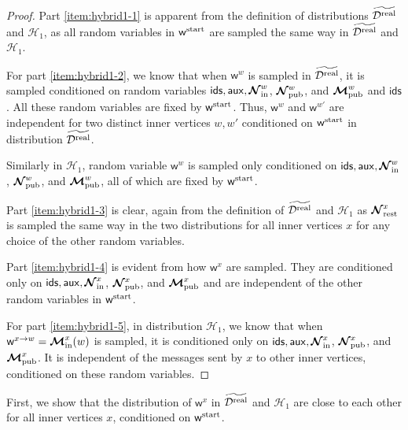 \documentclass[11pt]{article}
\theoremstyle{definition}
\newcommand{\rv}[1]{\ensuremath{{\mathsf{#1}}}\xspace}
\newcommand{\rNinner}[2]{\ensuremath{\bm{\mathcal{N}}_{\textnormal{in}}^{#1_{#2}}}}
\newcommand{\cH}{\ensuremath{\mathcal{H}}}
\newcommand{\cD}{\ensuremath{\mathcal{D}}}
\newcommand{\cDreal}{\ensuremath{\cD^{\textnormal{real}}}}
\newcommand{\cDrealtil}{\ensuremath{\widetilde{\cDreal}}}
\newcommand{\raux}{\ensuremath{\rv{aux}}}
\newcommand{\rNpub}[1]{\ensuremath{\bm{\mathcal{N}}_{\textnormal{pub}}^{#1}}}
\newcommand{\rMpub}[1]{\ensuremath{\bm{\mathcal{M}}_{\textnormal{pub}}^{#1}}}
\newcommand{\rMinner}[1]{\ensuremath{\bm{\mathcal{M}}_{\textnormal{in}}^{#1}}}
\newcommand{\rNrest}[1]{\ensuremath{\bm{\mathcal{N}}^{#1}_{\textnormal{rest}}}}
\newcommand{\rids}{\ensuremath{\rv{ids}}}
\newcommand{\rw}{\rv{w}}
\newcommand{\rwstart}{\rv{w}^{\textnormal{start}}}
\begin{document}
\begin{proof}
Part \ref{item:hybrid1-1} is apparent from the definition of distributions $\cDrealtil$ and $\cH_1$, as all random variables in $\rwstart$ are sampled the same way in $\cDrealtil$ and $\cH_1$.

For part \ref{item:hybrid1-2}, we know that when $\rw^{w}$ is sampled in $\cDrealtil$, it is sampled conditioned on random variables $\rids, \raux,  \rNinner{w}{}$, $\rNpub{w}$, and $\rMpub{w}$ and $\rids$. All these random variables are fixed by $\rwstart$. Thus, $\rw^{w}$ and $\rw^{w'}$ are independent for two distinct inner vertices $w, w'$ conditioned on $\rwstart$ in distribution $\cDrealtil$. 

Similarly in $\cH_1$, random variable $\rw^{w}$ is sampled only conditioned on $\rids, \raux,  \rNinner{w}{}$, $\rNpub{w}$, and $\rMpub{w}$, all of which are fixed by $\rwstart$.

Part \ref{item:hybrid1-3} is clear, again from the definition of $\cDrealtil$ and $\cH_1$ as $\rNrest{x}$ is sampled the same way in the two distributions for all inner vertices $x$ for any choice of the other random variables. 

Part \ref{item:hybrid1-4} is evident from how $\rw^{x}$ are sampled. They are conditioned only on $\rids, \raux,  \rNinner{x}{}$, $\rNpub{x}$, and $\rMpub{x}$ and are independent of the other random variables in $\rwstart$.

For part \ref{item:hybrid1-5}, in distribution $\cH_1$, we know that when $\rw^{x \to w} = \rMinner{x}(w)$ is sampled, it is conditioned only on $\rids, \raux,  \rNinner{x}{}$, $\rNpub{x}$, and $\rMpub{x}$. It is independent of the messages sent by $x$ to other inner vertices, conditioned on these random variables. 
\end{proof}

First, we show that the distribution of $\rw^{x}$ in $\cDrealtil$ and $\cH_1$ are close to each other for all inner vertices $x$, conditioned on $\rwstart$. 
\end{document}

